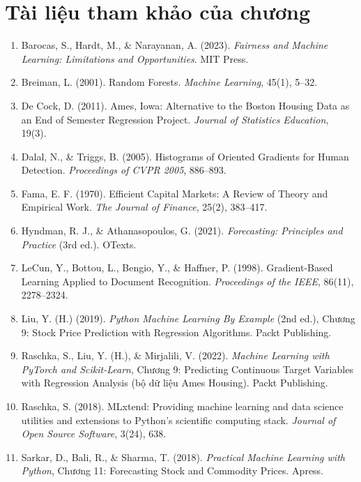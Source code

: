 \section*{Tài liệu tham khảo của chương}
\begin{enumerate}
    \item Barocas, S., Hardt, M., \& Narayanan, A. (2023). \textit{Fairness and Machine Learning: Limitations and Opportunities}. MIT Press.
    \item Breiman, L. (2001). Random Forests. \textit{Machine Learning}, 45(1), 5--32.
    \item De Cock, D. (2011). Ames, Iowa: Alternative to the Boston Housing Data as an End of Semester Regression Project. \textit{Journal of Statistics Education}, 19(3).
    \item Dalal, N., \& Triggs, B. (2005). Histograms of Oriented Gradients for Human Detection. \textit{Proceedings of CVPR 2005}, 886--893.
    \item Fama, E. F. (1970). Efficient Capital Markets: A Review of Theory and Empirical Work. \textit{The Journal of Finance}, 25(2), 383--417.
    \item Hyndman, R. J., \& Athanasopoulos, G. (2021). \textit{Forecasting: Principles and Practice} (3rd ed.). OTexts.
    \item LeCun, Y., Bottou, L., Bengio, Y., \& Haffner, P. (1998). Gradient-Based Learning Applied to Document Recognition. \textit{Proceedings of the IEEE}, 86(11), 2278--2324.
    \item Liu, Y. (H.) (2019). \textit{Python Machine Learning By Example} (2nd ed.), Chương 9: Stock Price Prediction with Regression Algorithms. Packt Publishing.
    \item Raschka, S., Liu, Y. (H.), \& Mirjalili, V. (2022). \textit{Machine Learning with PyTorch and Scikit-Learn}, Chương 9: Predicting Continuous Target Variables with Regression Analysis (bộ dữ liệu Ames Housing). Packt Publishing.
    \item Raschka, S. (2018). MLxtend: Providing machine learning and data science utilities and extensions to Python's scientific computing stack. \textit{Journal of Open Source Software}, 3(24), 638.
    \item Sarkar, D., Bali, R., \& Sharma, T. (2018). \textit{Practical Machine Learning with Python}, Chương 11: Forecasting Stock and Commodity Prices. Apress.
\end{enumerate}
